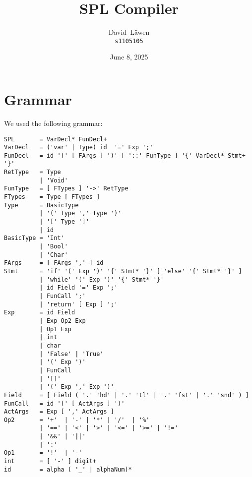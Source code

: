 \documentclass[dvipsnames]{report}
\author{%
	David~L\"awen\\
	\small\texttt{s1105105}
}
\date{June 8, 2025}
\title{SPL Compiler}
\begin{document}
\maketitle%

\tableofcontents%
















\appendix
\chapter{Grammar} \label{chp:grammar}

We used the following grammar:

\begin{verbatim}
SPL       = VarDecl* FunDecl+
VarDecl   = ('var' | Type) id  '=' Exp ';'
FunDecl   = id '(' [ FArgs ] ')' [ '::' FunType ] '{' VarDecl* Stmt+ '}'
RetType   = Type
          | 'Void'
FunType   = [ FTypes ] '->' RetType
FTypes    = Type [ FTypes ]
Type      = BasicType
          | '(' Type ',' Type ')'
          | '[' Type ']'
          | id
BasicType = 'Int'
          | 'Bool'
          | 'Char'
FArgs     = [ FArgs ',' ] id
Stmt      = 'if' '(' Exp ')' '{' Stmt* '}' [ 'else' '{' Stmt* '}' ]
          | 'while' '(' Exp ')' '{' Stmt* '}'
          | id Field '=' Exp ';'
          | FunCall ';'
          | 'return' [ Exp ] ';'
Exp       = id Field
          | Exp Op2 Exp
          | Op1 Exp
          | int
          | char
          | 'False' | 'True'
          | '(' Exp ')'
          | FunCall
          | '[]'
          | '(' Exp ',' Exp ')'
Field     = [ Field ( '.' 'hd' | '.' 'tl' | '.' 'fst' | '.' 'snd' ) ]
FunCall   = id '(' [ ActArgs ] ')'
ActArgs   = Exp [ ',' ActArgs ]
Op2       = '+'  | '-' | '*' | '/'  | '%'
          | '==' | '<' | '>' | '<=' | '>=' | '!='
          | '&&' | '||'
          | ':'
Op1       = '!'  | '-'
int       = [ '-' ] digit+
id        = alpha ( '_' | alphaNum)*
\end{verbatim}
\end{document}
